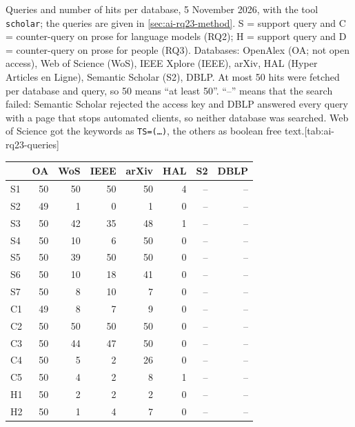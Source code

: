 \begin{table}[htbp]
  \begin{sidecaption}{Queries and number of hits per database, 5 November
    2026, with the tool \texttt{scholar}; the queries are given in
    \cref{sec:ai-rq23-method}.
    S = support query and C = counter-query on prose for language models (RQ2);
    H = support query and D = counter-query on prose for people (RQ3).
    Databases: OpenAlex (OA; not open access), Web of Science (WoS), IEEE
    Xplore (IEEE), arXiv, HAL (Hyper Articles en Ligne), Semantic Scholar (S2),
    DBLP.
    At most 50 hits were fetched per database and query, so 50 means
    \enquote{at least 50}.
    \enquote{--} means that the search failed: Semantic Scholar rejected the
    access key and DBLP answered every query with a page that stops automated
    clients, so neither database was searched.
    Web of Science got the keywords as \texttt{TS=(\dots)}, the others as
    boolean free text.}[tab:ai-rq23-queries] \centering\footnotesize
    \begin{tabular}{@{}lrrrrrrr@{}}
      \toprule
         & OA & WoS & IEEE & arXiv & HAL & S2 & DBLP \\
      \midrule
      S1 & 50 & 50  & 50   & 50    & 4   & -- & --   \\
      S2 & 49 & 1   & 0    & 1     & 0   & -- & --   \\
      S3 & 50 & 42  & 35   & 48    & 1   & -- & --   \\
      S4 & 50 & 10  & 6    & 50    & 0   & -- & --   \\
      S5 & 50 & 39  & 50   & 50    & 0   & -- & --   \\
      S6 & 50 & 10  & 18   & 41    & 0   & -- & --   \\
      S7 & 50 & 8   & 10   & 7     & 0   & -- & --   \\
      \midrule
      C1 & 49 & 8   & 7    & 9     & 0   & -- & --   \\
      C2 & 50 & 50  & 50   & 50    & 0   & -- & --   \\
      C3 & 50 & 44  & 47   & 50    & 0   & -- & --   \\
      C4 & 50 & 5   & 2    & 26    & 0   & -- & --   \\
      C5 & 50 & 4   & 2    & 8     & 1   & -- & --   \\
      \midrule
      H1 & 50 & 2   & 2    & 2     & 0   & -- & --   \\
      H2 & 50 & 1   & 4    & 7     & 0   & -- & --   \\

\end{tabular}
\end{sidecaption}
\end{table}

